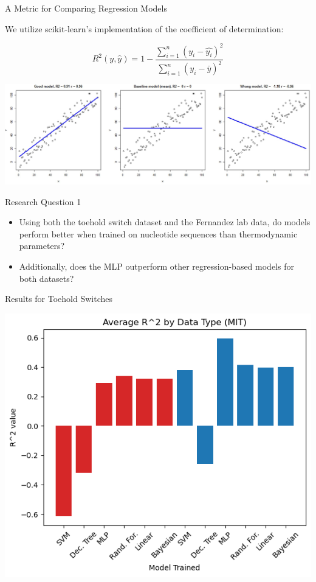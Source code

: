 \documentclass[9pt, dvipsnames]{beamer}
\begin{document}
\begin{frame}{A Metric for Comparing Regression Models}

    We utilize scikit-learn's implementation of the coefficient of determination:

    \[R^2(y,\hat{y}) = 1 - \frac{\sum_{i=1}^n (y_i - \hat{y_i})^2}{\sum_{i=1}^n (y_i - \bar{y})^2}\]
    \pause
    \vspace{.1in}
    \begin{center}
        \includegraphics[height=0.3\paperheight]{assets/R2_comparison.jpg}
    \end{center}
\end{frame}

\begin{frame}{Research Question 1}
    \Large
    \begin{itemize}
        \item Using both the toehold switch dataset and the
        Fernandez lab data, do models perform
        better when trained on nucleotide sequences than thermodynamic parameters? 
        \bigskip
        \item Additionally, does the MLP outperform other
        regression-based models for both datasets?
    \end{itemize}
\end{frame}

\begin{frame}{Results for Toehold Switches}
    \begin{center}
        \includegraphics[height=0.7\paperheight]{assets/Average-R^2-by-Data-Type-MIT.png}
    \end{center}
\end{frame}
\end{document}
